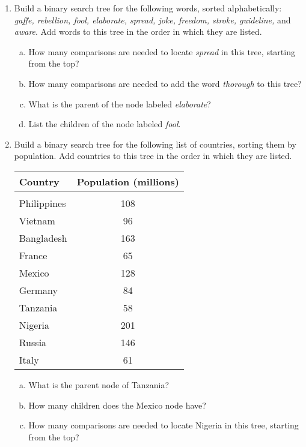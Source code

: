 \begin{enumerate}
\item Build a binary search tree for the following words, sorted alphabetically: \emph{gaffe, rebellion, fool, elaborate, spread, joke, freedom, stroke, guideline,} and \emph{aware}.  Add words to this tree in the order in which they are listed.
\begin{enumerate}[(a)]
\item How many comparisons are needed to locate \textit{spread} in this tree, starting from the top?
\item How many comparisons are needed to add the word \emph{thorough} to this tree?
\item What is the parent of the node labeled \emph{elaborate}?
\item List the children of the node labeled \emph{fool}.
\end{enumerate}

\item Build a binary search tree for the following list of countries, sorting them by population.  Add countries to this tree in the order in which they are listed.
\begin{center}
\begin{tabular}{l c}
\textbf{Country} & \textbf{Population (millions)}\\
\hline
& \\
Philippines & 108\\
Vietnam & 96\\
Bangladesh & 163\\
France & 65\\
Mexico & 128\\
Germany & 84\\
Tanzania & 58\\
Nigeria & 201\\
Russia & 146\\
Italy & 61
\end{tabular}
\end{center}
\begin{enumerate}[(a)]
\item What is the parent node of Tanzania?
\item How many children does the Mexico node have?
\item How many comparisons are needed to locate Nigeria in this tree, starting from the top?
\end{enumerate}


\end{enumerate}
